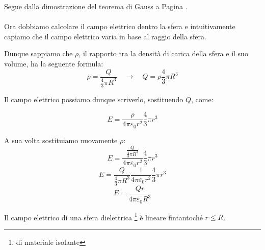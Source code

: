 Segue dalla dimostrazione del teorema di Gauss a Pagina \pageref{teoremaGauss}.
\paragraph{}
Ora dobbiamo calcolare il campo elettrico dentro la sfera  e intuitivamente capiamo che il campo elettrico varia in base al raggio della sfera.

Dunque sappiamo che $\rho$, il rapporto tra la densità di carica della sfera e il suo volume, ha la seguente formula:
\begin{equation*}
    \rho = \frac{Q}{\frac{4}{3}\pi R^3}\quad\rightarrow\quad Q = \rho \frac{4}{3}\pi R^3
\end{equation*}

Il campo elettrico possiamo dunque scriverlo,  sostituendo $Q$, come: 

\begin{equation*}
    E = \frac{\rho}{4\pi \varepsilon_0 r^2}\frac{4}{3}\pi r^3
\end{equation*}

A sua volta sostituiamo nuovamente $\rho$:
\begin{equation*}
    E = \frac{\frac{Q}{\frac{4}{3}\pi R^3}}{4\pi \varepsilon_0 r^2}\frac{4}{3}\pi r^3
\end{equation*}
\begin{equation*}
    E = \frac{Q}{\frac{4}{3}\pi R^3}\frac{1}{4\pi \varepsilon_0 r^2}\frac{4}{3}\pi r^3
\end{equation*}
\begin{equation*}
    E = \frac{Q r}{4\pi \varepsilon_0 R^3}
\end{equation*}

Il campo elettrico di una sfera dielettrica \footnote{di materiale isolante} è lineare fintantoché $r \le R$.


